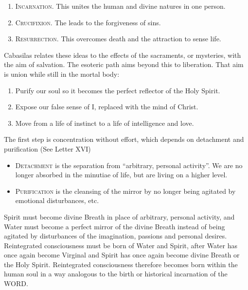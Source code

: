 \begin{enumerate}
\item \textsc{Incarnation}. This unites the human and divine natures in one person. 
\item \textsc{Crucifixion}. The leads to the forgiveness of sins. 
\item \textsc{Resurrection}. This overcomes death and the attraction to sense life. 
\end{enumerate}
Cabasilas relates these ideas to the effects of the sacraments, or mysteries, with the aim of salvation. The esoteric
path aims beyond this to liberation. That aim is union while still in the mortal body:

\begin{enumerate}
\item Purify our soul so it becomes the perfect reflector of the Holy Spirit. 
\item Expose our false sense of I, replaced with the mind of Christ. 
\item Move from a life of instinct to a life of intelligence and love. 
\end{enumerate}
The first step is concentration without effort, which depends on detachment and purification (See Letter XVI)

\begin{itemize}
\item \textsc{Detachment }is the separation from “arbitrary, personal activity”. We are no longer absorbed in the
minutiae of life, but are living on a higher level. 
\item \textsc{Purification }is the cleansing of the mirror by no longer being agitated by emotional disturbances, etc. 
\end{itemize}
\begin{quotationx}
Spirit must become divine Breath in place of arbitrary, personal activity, and Water must become a perfect mirror of the
divine Breath instead of being agitated by disturbances of the imagination, passions and personal desires. Reintegrated
consciousness must be born of Water and Spirit, after Water has once again become Virginal and Spirit has once again
become divine Breath or the Holy Spirit. Reintegrated consciousness therefore becomes born within the human soul in a
way analogous to the birth or historical incarnation of the WORD. 

\end{quotationx}

